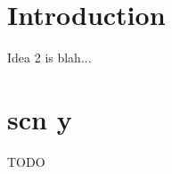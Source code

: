 \documentclass[12pt,a4paper]{article}
\begin{document}

\section*{Introduction}

Idea 2 is blah...

\section*{scn y}

TODO
\end{document}
